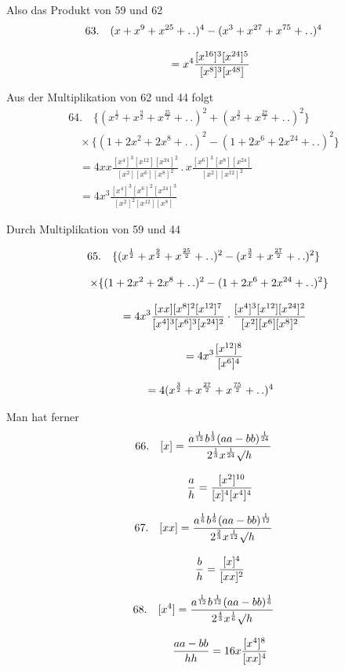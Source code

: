 Also das Produkt von 59 und 62
\[
\begin{gathered}63.\quad{}
(x+x^9+x^{25}+\mathinner{.\,.})^4-(x^3+x^{27}+x^{75}+\mathinner{.\,.})^4
\\[8pt]\quad{}=x^4\frac{[x^{16}]^3[x^{24}]^5}{[x^8]^3[x^{48}]}\end{gathered}
\]


Aus der Multiplikation von 62 und 44 folgt
\[
\begin{gathered}
64.\quad{}
\{(x^{\frac12}+x^{\frac92}+x^{\frac{25}2}+ .\,. )^2+(x^{\frac32}+x^{\frac{27}2}+ .\,. )^2\}\\[8pt]
\quad\times\{(1+2x^2+2x^8+ .\,. )^2-(1+2x^6+2x^{24}+ .\,. )^2\}\\[8pt]
\quad=4xx\frac{[x^4]^3[x^{12}][x^{24}]^2}{[x^2][x^6][x^8]^2}\,.\,x\frac{[x^6]^3[x^8][x^{24}]}{[x^2][x^{12}]^2}
\\[8pt]\quad{}=4x^3\frac{[x^4]^3[x^6]^2[x^{24}]^3}{[x^2]^2[x^{12}][x^8]}
\end{gathered}
\]


Durch Multiplikation von 59 und 44


\[
\begin{gathered}
65.\quad{}
\{(x^{\frac12}+x^{\frac92}+x^{\frac{25}2}+\mathinner{.\,.})^2
 -(x^{\frac32}+x^{\frac{27}2}+\mathinner{.\,.})^2\}\\[8pt]
\quad\times\{(1+2x^2+2x^8+\mathinner{.\,.})^2
 -(1+2x^6+2x^{24}+\mathinner{.\,.})^2\}\\[8pt]
\qquad=4x^3\frac{[xx][x^8]^2[x^{12}]^7}{[x^4]^3[x^6]^3[x^{24}]^2}
 \cdot\frac{[x^4]^3[x^{12}][x^{24}]^2}{[x^2][x^6][x^8]^2}\\[8pt]
\qquad=4x^3\frac{[x^{12}]^8}{[x^6]^4}
 \\[8pt]\quad{}=4(x^{\frac32}+x^{\frac{27}2}+x^{\frac{75}2}+\mathinner{.\,.})^4
\end{gathered}
\]

Man hat ferner
\[
\begin{gathered}66.\quad{}
[x]=\frac{a^{\frac1{12}}b^{\frac13}(aa-bb)^{\frac1{24}}}
 {2^{\frac13}x^{\frac1{24}}\mathord{\surd}h}
\\[8pt]\quad{}\qquad
\frac ah=\frac{[x^2]^{10}}{[x]^4[x^4]^4}\end{gathered}
\]

\[
\begin{gathered}67.\quad{}
[xx]=\frac{a^{\frac16}b^{\frac16}(aa-bb)^{\frac1{12}}}
 {2^{\frac23}x^{\frac1{12}}\mathord{\surd}h}
\\[8pt]\quad{}\qquad
\frac bh=\frac{[x]^4}{[xx]^2}\end{gathered}
\]

\[
\begin{gathered}68.\quad{}
[x^4]=\frac{a^{\frac1{12}}b^{\frac1{12}}(aa-bb)^{\frac16}}
 {2^{\frac43}x^{\frac16}\mathord{\surd}h}
\\[8pt]\quad{}\qquad
\frac{aa-bb}{hh}=16x\frac{[x^4]^8}{[xx]^4}\end{gathered}
\]

\clearpage
\endgroup
